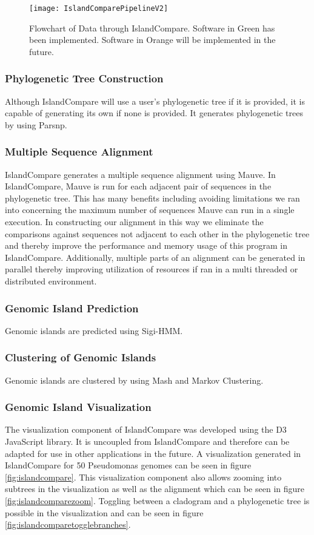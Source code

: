 		\begin{figure}[h]
			\centering
			\texttt{[image: IslandComparePipelineV2]}
			\caption{\label{fig:islandcomparepipeline} Flowchart of Data through IslandCompare. Software in Green has been implemented. Software in Orange will be implemented in the future.}
		\end{figure}
	
	\subsubsection{Phylogenetic Tree Construction}
		Although IslandCompare will use a user's phylogenetic tree if it is provided, it is capable of generating its own if none is provided. It generates phylogenetic trees by using Parsnp.\cite{7_treangen_ondov_koren_phillippy_2014}
	
	\subsubsection{Multiple Sequence Alignment}
		IslandCompare generates a multiple sequence alignment using Mauve.\cite{10_mauve} In IslandCompare, Mauve is run for each adjacent pair of sequences in the phylogenetic tree. This has many benefits including avoiding limitations we ran into concerning the maximum number of sequences Mauve can run in a single execution. In constructing our alignment in this way we eliminate the comparisons against sequences not adjacent to each other in the phylogenetic tree and thereby improve the performance and memory usage of this program in IslandCompare. Additionally, multiple parts of an alignment can be generated in parallel thereby improving utilization of resources if ran in a multi threaded or distributed environment.
	
	\subsubsection{Genomic Island Prediction}
		Genomic islands are predicted using Sigi-HMM.\cite{11_sigihmm}
		
	\subsubsection{Clustering of Genomic Islands}
		Genomic islands are clustered by using Mash and Markov Clustering.\cite{12_mash, 13_mcl}
	
	\subsubsection{Genomic Island Visualization}	
		The visualization component of IslandCompare was developed using the D3 JavaScript library.\cite{6_d3} It is uncoupled from IslandCompare and therefore can be adapted for use in other applications in the future. A visualization generated in IslandCompare for 50 Pseudomonas genomes can be seen in figure \ref{fig:islandcompare}. This visualization component also allows zooming into subtrees in the visualization as well as the alignment which can be seen in figure \ref{fig:islandcomparezoom}. Toggling between a cladogram and a phylogenetic tree is possible in the visualization and can be seen in figure \ref{fig:islandcomparetogglebranches}.
		
